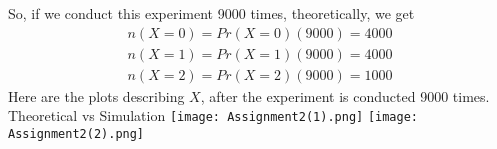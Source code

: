 \documentclass[journal,12pt,twocolumn]{IEEEtran}
\begin{document}
\newline
\newline
\newline
So, if we conduct this experiment 9000 times, theoretically, we get 
\begin{align}
    \tag{5.25.15}
    n(X=0)=Pr(X=0)(9000)=4000\\
    \tag{5.25.16}
    n(X=1)=Pr(X=1)(9000)=4000\\
    \tag{5.25.17}
    n(X=2)=Pr(X=2)(9000)=1000
\end{align}
\newpage
Here are the plots describing $X$, after the experiment is conducted 9000 times.
\newline
\newline
Theoretical vs Simulation
\newline
\newline
\texttt{[image: Assignment2(1).png]}
\texttt{[image: Assignment2(2).png]}
\end{document}
